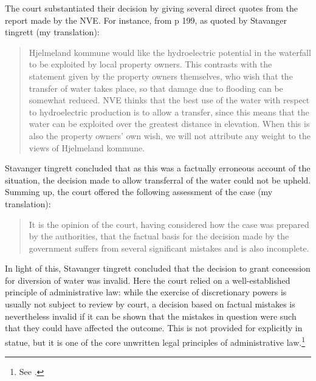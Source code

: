 The court substantiated their decision by giving several direct quotes from the report made by the NVE. For instance, from p 199, as quoted by Stavanger tingrett (my translation):
\begin{quote}
Hjelmeland kommune would like the hydroelectric potential in the waterfall to be exploited by 
local property owners. This contrasts with the statement given by the property owners 
themselves, who wish that the transfer of water takes place, so that damage due to flooding can be 
somewhat reduced. NVE thinks that the best use of the water with respect to hydroelectric 
production is to allow a transfer, since this means that the water can be exploited over the greatest
distance in elevation. When this is also the property owners' own wish, we will not attribute any 
weight to the views of Hjelmeland kommune.
\end{quote}

Stavanger tingrett concluded that as this was a factually erroneous account of the situation, the decision made to allow transferral of the water could not be upheld. Summing up, the court offered the following assessment of the case (my translation):

\begin{quote}
It is the opinion of the court, having considered how the case was prepared by the authorities, that the factual basis for the decision made by the government suffers from several significant mistakes and is also incomplete.
\end{quote}

In light of this, Stavanger tingrett concluded that the decision to grant concession for diversion of water was invalid. Here the court relied on a well-established principle of administrative law: while the exercise of discretionary powers is usually not subject to review by court, a decision based on factual mistakes is nevertheless invalid if it can be shown that the mistakes in question were such that they could have affected the outcome. This is not provided for explicitly in statue, but it is one of the core unwritten legal principles of administrative law.\footnote{See \cite{eckhoff14}.}

